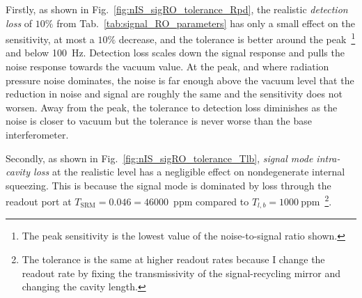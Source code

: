 Firstly, as shown in Fig.~\ref{fig:nIS_sigRO_tolerance_Rpd}, the realistic \emph{detection loss} of $10\%$ from Tab.~\ref{tab:signal_RO_parameters} has only a small effect on the sensitivity, at most a $10\%$ decrease, and the tolerance is better around the peak~\footnote{The peak sensitivity is the lowest value of the noise-to-signal ratio shown.} and below 100~Hz.
Detection loss scales down the signal response and pulls the noise response towards the vacuum value. At the peak, and where radiation pressure noise dominates, the noise is far enough above the vacuum level that the reduction in noise and signal are roughly the same and the sensitivity does not worsen. Away from the peak, the tolerance to detection loss diminishes as the noise is closer to vacuum but the tolerance is never worse than the base interferometer. %

Secondly, as shown in Fig.~\ref{fig:nIS_sigRO_tolerance_Tlb}, \emph{signal mode intra-cavity loss} at the realistic level has a negligible effect on nondegenerate internal squeezing. This is because the signal mode is dominated by loss through the readout port at $T_\text{SRM}=0.046=46000$~ppm compared to $T_{l,b}=1000~\text{ppm}$~\footnote{The tolerance is the same at higher readout rates because I change the readout rate by fixing the transmissivity of the signal-recycling mirror and changing the cavity length.}. %

